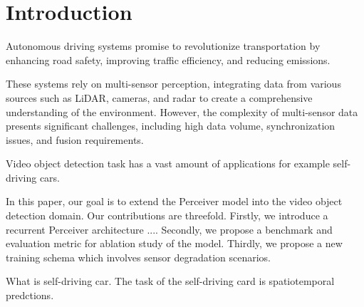 \section{Introduction} \label{Introduction}

Autonomous driving systems promise to revolutionize transportation by enhancing road safety, improving traffic efficiency, and reducing emissions.


These systems rely on multi-sensor perception, integrating data from various sources such as LiDAR, cameras, and radar to create a comprehensive understanding of the environment. However, the complexity of multi-sensor data presents significant challenges, including high data volume, synchronization issues, and fusion requirements.

Video object detection task has a vast amount of applications for example self-driving cars.


In this paper, our goal is to extend the Perceiver model into the video object detection domain. Our contributions are threefold.
Firstly, we introduce a recurrent Perceiver architecture ....
Secondly, we propose a benchmark and evaluation metric for ablation study of the model.
Thirdly, we propose a new training schema which involves sensor degradation scenarios.

What is self-driving car. The task of the self-driving card is spatiotemporal predctions.

